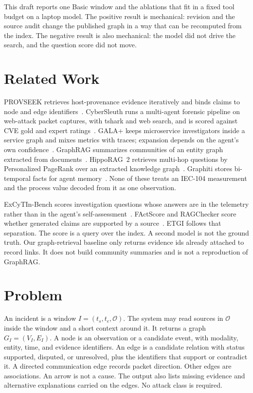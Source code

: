 \documentclass[conference]{IEEEtran}
\begin{document}
This draft reports one Basic window and the ablations that fit in a fixed tool budget on a laptop model.
The positive result is mechanical: revision and the source audit change the published graph in a way that can be recomputed from the index.
The negative result is also mechanical: the model did not drive the search, and the question score did not move.

\section{Related Work}
PROVSEEK retrieves host-provenance evidence iteratively and binds claims to node and edge identifiers~\cite{provseek}.
CyberSleuth runs a multi-agent forensic pipeline on web-attack packet captures, with tshark and web search, and is scored against CVE gold and expert ratings~\cite{cybersleuth}.
GALA+ keeps microservice investigators inside a service graph and mixes metrics with traces; expansion depends on the agent's own confidence~\cite{gala}.
GraphRAG summarizes communities of an entity graph extracted from documents~\cite{graphrag}.
HippoRAG~2 retrieves multi-hop questions by Personalized PageRank over an extracted knowledge graph~\cite{hipporag2}.
Graphiti stores bi-temporal facts for agent memory~\cite{zep}.
None of these treats an IEC-104 measurement and the process value decoded from it as one observation.

ExCyTIn-Bench scores investigation questions whose answers are in the telemetry rather than in the agent's self-assessment~\cite{excytin}.
FActScore and RAGChecker score whether generated claims are supported by a source~\cite{factscore,ragchecker}.
ETGI follows that separation.
The score is a query over the index.
A second model is not the ground truth.
Our graph-retrieval baseline only returns evidence ids already attached to record links.
It does not build community summaries and is not a reproduction of GraphRAG.

\section{Problem}
An incident is a window $I=(t_s,t_e,\mathcal{O})$.
The system may read sources in $\mathcal{O}$ inside the window and a short context around it.
It returns a graph $G_I=(V_I,E_I)$.
A node is an observation or a candidate event, with modality, entity, time, and evidence identifiers.
An edge is a candidate relation with status supported, disputed, or unresolved, plus the identifiers that support or contradict it.
A directed communication edge records packet direction.
Other edges are associations.
An arrow is not a cause.
The output also lists missing evidence and alternative explanations carried on the edges.
No attack class is required.
\end{document}
